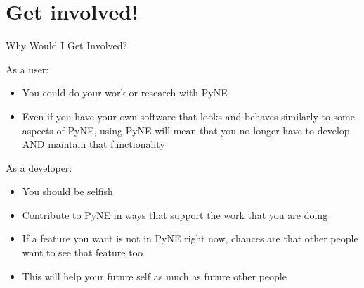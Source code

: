 \documentclass[xcolor=x11names,compress]{beamer}
\renewcommand{\(}{\begin{columns}}
\renewcommand{\)}{\end{columns}}
\newcommand{\<}[1]{\begin{column}{#1}}
\renewcommand{\>}{\end{column}}
\begin{document}
\section{Get involved!}
\begin{frame}{Why Would I Get Involved?}

\begin{block}{As a \alert{user}:}
    \begin{itemize}
    \item You could do your work or research with PyNE
    \item Even if you have your own software that looks and behaves similarly to some aspects of PyNE, using PyNE will mean that you no longer have to develop AND maintain that functionality
    \end{itemize}        
\end{block}

    \vspace*{1 em}
\begin{block}{As a \alert{developer}:}
    \begin{itemize}
    \item You should be selfish
    \item Contribute to PyNE in ways that support the work that you are doing
    \item If a feature you want is not in PyNE right now, chances are that other 
    people want to see that feature too
    \item This will help your future self as much as future other people
    \end{itemize}    
\end{block}

\end{frame}
\end{document}
